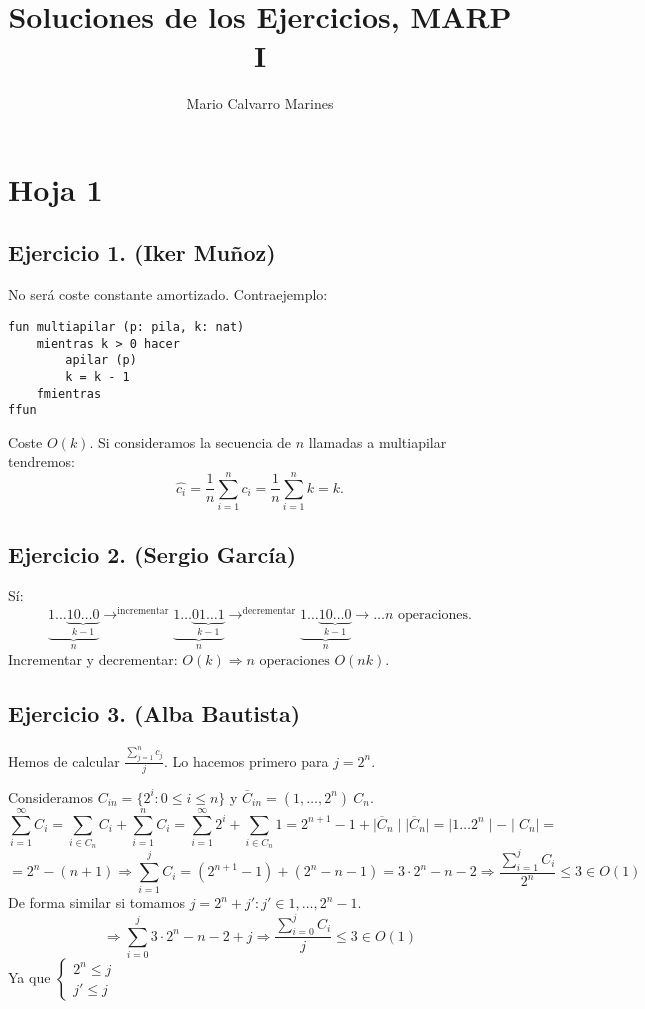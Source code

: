 \documentclass[10pt,a4paper,openright]{book}
\title{Soluciones de los Ejercicios, MARP I}
\author{Mario Calvarro Marines}
\date{}
\theoremstyle{break}
\begin{document}
\maketitle
\setcounter{tocdepth}{3}%
\tableofcontents
\chapter{Hoja 1}%
\label{cha:hoja_1}

\section{Ejercicio 1. (Iker Muñoz)}%
\label{sec:ejercicio_1}
No será coste constante amortizado. Contraejemplo:
\begin{lstlisting}
fun multiapilar (p: pila, k: nat)
    mientras k > 0 hacer
        apilar (p)
        k = k - 1
    fmientras
ffun
\end{lstlisting}
Coste $O\left( k \right)$. Si consideramos la secuencia de $n$ llamadas a multiapilar tendremos:
\[
\hat{c_i} = \frac{1}{n} \sum_{i=1}^{n} c_i = \frac{1}{n} \sum_{i=1}^{n} k = k.  
\]

\section{Ejercicio 2. (Sergio García)}%
\label{sec:ejercicio_2}
Sí:
\[
\underbrace{1 \ldots \underbrace{10 \ldots 0}_{k - 1}}_{n} \rightarrow^{\text{incrementar}}  \underbrace{1 \ldots \underbrace{01 \ldots 1}_{k-1}}_{n} \rightarrow^{\text{decrementar}}  \underbrace{1 \ldots \underbrace{10 \ldots 0}_{k-1}}_{n} \rightarrow \ldots n \text{ operaciones.} 
\]
Incrementar y decrementar: $O\left( k \right) \Rightarrow n \text{ operaciones } O\left( nk \right)$.  

\section{Ejercicio 3. (Alba Bautista)}%
\label{sec:ejercicio_3}
Hemos de calcular $\frac{\sum_{j=1}^{n} c_j}{j}$. Lo hacemos primero para $j = 2^n$. 

Consideramos $C_{in} = \{2^i : 0 \le i \le n\}$ y $\overline{C}_{in} = \left( 1, \ldots, 2^n \right) \ C_n$. 
\[
\sum_{i=1}^{\infty} C_i = \sum_{i \in C_n} C_i + \sum_{i=1}^{n} C_i = \sum_{i=1}^{\infty} 2^i + \sum_{i \in C_n} 1 = 2^{n+1} - 1 + \mid \overline{C}_n \mid \mid \overline{C}_n\mid = \mid 1 \ldots 2^n\mid - \mid C_n \mid = 
\]\[
= 2^n - \left( n + 1 \right) \Rightarrow \sum_{i=1}^{j} C_i = \left( 2^{n + 1} - 1 \right) + \left( 2^n - n - 1 \right) = 3 \cdot 2^n - n - 2 \Rightarrow \frac{\sum_{i=1}^{j} C_i}{2^n} \le 3 \in O\left( 1 \right) 
\]
De forma similar si tomamos $j = 2^n + j': j' \in 1, \ldots, 2^n - 1$.
\[
\Rightarrow \sum_{i=0}^{j} 3\cdot 2^n - n - 2 + j \Rightarrow \frac{\sum_{i=0}^{j} C_i}{j} \le 3 \in O\left( 1 \right)    
\]
Ya que $\begin{cases}
    2^n \le j\\
    j' \le j
\end{cases} $
\end{document}
